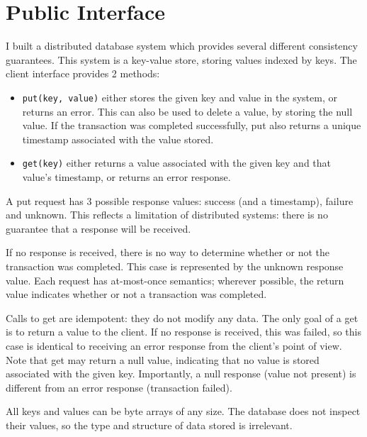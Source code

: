 \documentclass[12pt,a4paper,twoside,openright]{report}
\begin{document}


\section{Public Interface}

I built a distributed database system which provides several different consistency guarantees. This system is a key-value store, storing values indexed by keys. The client interface provides 2 methods:

\begin{itemize}
\item
\verb|put(key, value)| either stores the given key and value in the system, or returns an error. This can also be used to delete a value, by storing the null value. If the transaction was completed successfully, put also returns a unique timestamp associated with the value stored.

\item
\verb|get(key)| either returns a value associated with the given key and that value's timestamp, or returns an error response.

\end{itemize}

A put request has 3 possible response values: success (and a timestamp), failure and unknown. This reflects a limitation of distributed systems: there is no guarantee that a response will be received.

If no response is received, there is no way to determine whether or not the transaction was completed. This case is represented by the unknown response value. Each request has at-most-once semantics; wherever possible, the return value indicates whether or not a transaction was completed.

Calls to get are idempotent: they do not modify any data. The only goal of a get is to return a value to the client. If no response is received, this was failed, so this case is identical to receiving an error response from the client's point of view. Note that get may return a null value, indicating that no value is stored associated with the given key. Importantly, a null response (value not present) is different from an error response (transaction failed).

All keys and values can be byte arrays of any size. The database does not inspect their values, so the type and structure of data stored is irrelevant.
\end{document}
